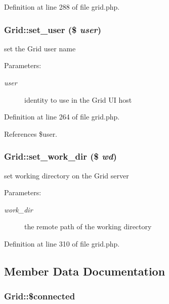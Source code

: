 Definition at line 288 of file grid.php.
\subsubsection{\setlength{\rightskip}{0pt plus 5cm}Grid::set\_\-user (\$ {\em user})}\label{classGrid_a1}


set the Grid user name 

\begin{Desc}
\item[Parameters:]
\begin{description}
\item[{\em user}]identity to use in the Grid UI host \end{description}
\end{Desc}


Definition at line 264 of file grid.php.

References \$user.
\subsubsection{\setlength{\rightskip}{0pt plus 5cm}Grid::set\_\-work\_\-dir (\$ {\em wd})}\label{classGrid_a5}


set working directory on the Grid server 

\begin{Desc}
\item[Parameters:]
\begin{description}
\item[{\em work\_\-dir}]the remote path of the working directory \end{description}
\end{Desc}


Definition at line 310 of file grid.php.

\subsection{Member Data Documentation}
\subsubsection{\setlength{\rightskip}{0pt plus 5cm}Grid::\$connected}\label{classGrid_o10}


